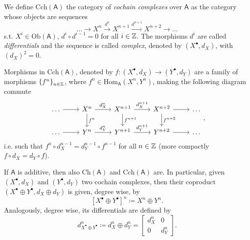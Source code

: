 \begin{defn}
	We define $\mathrm{Cch}(\mathsf{A})$ the category of {\em cochain complexes} over $\mathsf{A}$
	as the category whose objects are sequences
	\begin{equation}
	\ldots \to X^n \xrightarrow{d^n} X^{n+1}
	\xrightarrow{d^{n+1}} X^{n+2} \to \ldots
	\end{equation} 
	s.t. $X^i \in \mathrm{Ob} \left(\mathsf{A}\right)$, $d^i \circ d^{i-1} = 0$ for all $i \in \mathbb{Z}$.
	The morphisms $d^i$ are called {\em differentials} and the sequence is called {\em complex},
	denoted by $\left( X^{\bullet}, d_X \right)$, with $\left( d_X \right)^2 = 0$.

	Morphisms in $\mathrm{Cch}(\mathsf{A})$, denoted by
	$f\colon\left(X^{\bullet}, d_X\right) \to \left(Y^{\bullet}, d_Y\right)$
	are a family of morphisms $\left\{ f^n \right\}_{n \in \mathbb{Z}}$, where
	$f^n \in \mathrm{Hom}_{\mathsf{A}} \left( X^n, Y^n \right)$,
	making the following diagram commute
	\begin{equation}
	\begin{tikzcd}
		\ldots \arrow[r, "", rightarrow] &
		X^n \arrow[r, "d_X^n", rightarrow] \arrow[d, "f^n", rightarrow] &
		X^{n+1} \arrow[r, "d_X^{n+1}", rightarrow] \arrow[d, "f^{n+1}", rightarrow] &
		X^{n+2} \arrow[r, "", rightarrow] \arrow[d, "f^{n+2}", rightarrow] &
		\ldots \\
		\ldots \arrow[r, "", rightarrow] &
		Y^n \arrow[r, "d_Y^n", rightarrow]&
		Y^{n+1} \arrow[r, "d_Y^{n+1}", rightarrow] &
		Y^{n+2} \arrow[r, "", rightarrow] &
		\ldots
	\end{tikzcd}
	,\end{equation} 
	i.e. such that $f^n \circ d_X^{n-1} = d_Y^{n-1} \circ f^{n-1}$ for all $n \in \mathbb{Z}$
	(more compactly $f \circ d_X = d_Y \circ f$).
\end{defn}

\begin{rem}
	If $\mathsf{A}$ is additive, then also $\mathrm{Ch}(\mathsf{A})$ and $\mathrm{Cch}(\mathsf{A})$ are.
	In particular, given $\left(X^{\bullet}, d_X\right)$ and $\left(Y^{\bullet}, d_Y \right)$ two cochain complexes,
	then their coproduct $\left(X^{\bullet} \oplus Y^{\bullet}, d_X \oplus d_Y\right)$
	is given, degree wise, by
	\begin{equation}
	\left[ X^{\bullet} \oplus Y^{\bullet} \right]^n \coloneqq X^n \oplus Y^n.
	\end{equation} 
	Analogously, degree wise, its differentials are defined by
	\begin{equation}
	d^n_{X^{\bullet} \oplus Y^{\bullet}} \coloneqq
	d^n_X \oplus d^n_Y =
	\begin{bmatrix}
		d^n_X & 0\\
		0 & d^n_Y
	\end{bmatrix} 
	.\end{equation} 
\end{rem}


